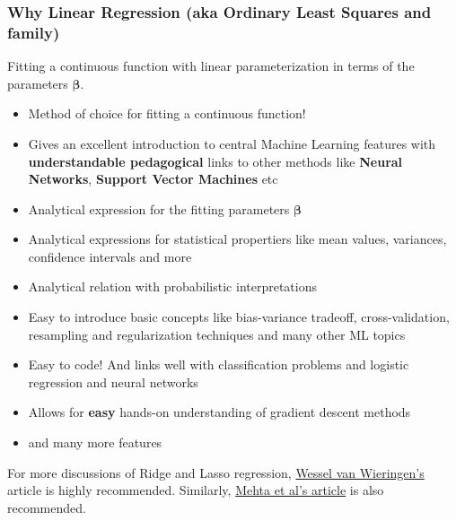 \documentclass{beamer}
\begin{document}
\begin{frame}
\frametitle{Why Linear Regression (aka Ordinary Least Squares and family)}

Fitting a continuous function with linear parameterization in terms of the parameters  $\bm{\beta}$.
\begin{itemize}
\item Method of choice for fitting a continuous function!

\item Gives an excellent introduction to central Machine Learning features with \textbf{understandable pedagogical} links to other methods like \textbf{Neural Networks}, \textbf{Support Vector Machines} etc

\item Analytical expression for the fitting parameters $\bm{\beta}$

\item Analytical expressions for statistical propertiers like mean values, variances, confidence intervals and more

\item Analytical relation with probabilistic interpretations 

\item Easy to introduce basic concepts like bias-variance tradeoff, cross-validation, resampling and regularization techniques and many other ML topics

\item Easy to code! And links well with classification problems and logistic regression and neural networks

\item Allows for \textbf{easy} hands-on understanding of gradient descent methods

\item and many more features
\end{itemize}

\noindent
For more discussions of Ridge and Lasso regression, \href{{https://arxiv.org/abs/1509.09169}}{Wessel van Wieringen's} article is highly recommended.
Similarly, \href{{https://arxiv.org/abs/1803.08823}}{Mehta et al's article} is also recommended.
\end{frame}
\end{document}
